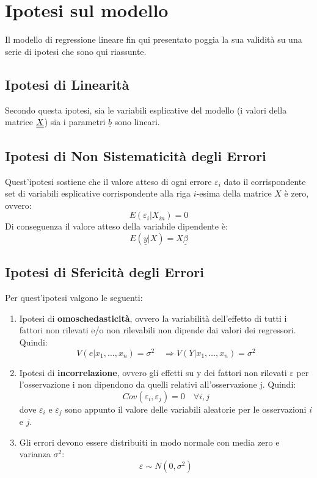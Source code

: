 \section{Ipotesi sul modello}
Il modello di regressione lineare fin qui presentato poggia la sua validità su una serie di ipotesi che sono qui riassunte.
\subsection{Ipotesi di Linearità}
Secondo questa ipotesi, sia le variabili esplicative del modello (i valori della matrice $\underline{\underline{X}}$) sia i parametri $\underline{b}$ sono lineari.

\subsection{Ipotesi di Non Sistematicità degli Errori}
Quest'ipotesi sostiene che il valore atteso di ogni errore $\varepsilon_i$ dato il corrispondente set di variabili esplicative corrispondente alla riga $i$-esima della matrice $X$ è zero, ovvero:
\begin{equation}
E\left(\varepsilon_i|{X}_{in}\right) = 0
\end{equation}
Di conseguenza il valore atteso della variabile dipendente è:
\begin{equation}
E\left(\underline{y}|{X}\right) = X \underline{\beta}
\end{equation}

\subsection{Ipotesi di Sfericità degli Errori}
Per quest'ipotesi valgono le seguenti:
\begin{enumerate}
	\item Ipotesi di \textbf{omoschedasticità}, ovvero la  variabilità  dell'effetto  di  tutti  i  fattori  non  rilevati  e/o  non  rilevabili  non  dipende  dai 
	valori dei regressori. Quindi:
	\begin{equation}
	V(e \vert x_1, \dots, x_n) = \sigma^2 \quad \Rightarrow V(Y \vert x_1, \dots, x_n) = \sigma^2
	\end{equation}
	\item Ipotesi di \textbf{incorrelazione}, ovvero gli  effetti su y dei  fattori  non  rilevati $\varepsilon$  per  l'osservazione i non  dipendono  da  quelli relativi all'osservazione j. Quindi:
	\begin{equation}
	Cov(\varepsilon_i, \varepsilon_j) = 0 \quad \forall i, j
	\end{equation}
	dove $\varepsilon_i$ e $\varepsilon_j$ sono appunto il valore delle variabili aleatorie per le osservazioni $i$ e $j$.
	\item Gli errori devono essere distribuiti in modo normale con media zero e varianza $\sigma^2$:
	\begin{equation}
	\varepsilon \sim N(0,\sigma^2)
	\end{equation}
\end{enumerate}

